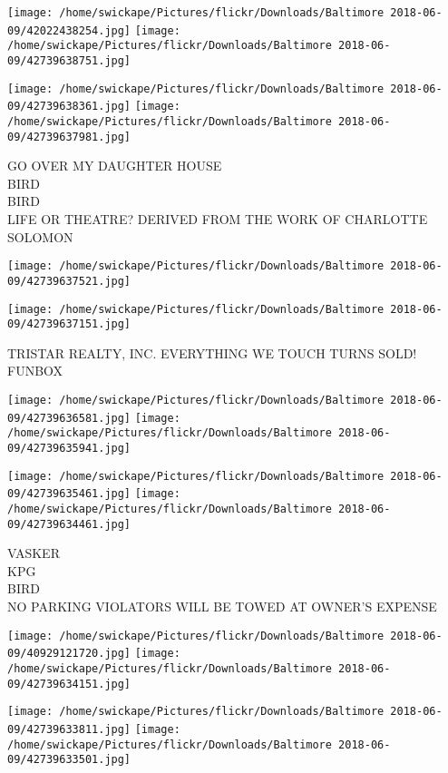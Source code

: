 \documentclass[10pt,letterpaper]{article}
\begin{document}
\texttt{[image: /home/swickape/Pictures/flickr/Downloads/Baltimore 2018-06-09/42022438254.jpg]}
\texttt{[image: /home/swickape/Pictures/flickr/Downloads/Baltimore 2018-06-09/42739638751.jpg]}

\texttt{[image: /home/swickape/Pictures/flickr/Downloads/Baltimore 2018-06-09/42739638361.jpg]}
\texttt{[image: /home/swickape/Pictures/flickr/Downloads/Baltimore 2018-06-09/42739637981.jpg]}

GO OVER MY DAUGHTER HOUSE\\
BIRD\\
BIRD\\
LIFE OR THEATRE? DERIVED FROM THE WORK OF CHARLOTTE SOLOMON
\pagebreak

\texttt{[image: /home/swickape/Pictures/flickr/Downloads/Baltimore 2018-06-09/42739637521.jpg]}

\vspace{0.25in}
\texttt{[image: /home/swickape/Pictures/flickr/Downloads/Baltimore 2018-06-09/42739637151.jpg]}

TRISTAR REALTY, INC. EVERYTHING WE TOUCH TURNS SOLD!\\
FUNBOX
\pagebreak

\texttt{[image: /home/swickape/Pictures/flickr/Downloads/Baltimore 2018-06-09/42739636581.jpg]}
\texttt{[image: /home/swickape/Pictures/flickr/Downloads/Baltimore 2018-06-09/42739635941.jpg]}

\texttt{[image: /home/swickape/Pictures/flickr/Downloads/Baltimore 2018-06-09/42739635461.jpg]}
\texttt{[image: /home/swickape/Pictures/flickr/Downloads/Baltimore 2018-06-09/42739634461.jpg]}

VASKER\\
KPG\\
BIRD\\
NO PARKING VIOLATORS WILL BE TOWED AT OWNER'S EXPENSE
\pagebreak

\texttt{[image: /home/swickape/Pictures/flickr/Downloads/Baltimore 2018-06-09/40929121720.jpg]}
\texttt{[image: /home/swickape/Pictures/flickr/Downloads/Baltimore 2018-06-09/42739634151.jpg]}

\texttt{[image: /home/swickape/Pictures/flickr/Downloads/Baltimore 2018-06-09/42739633811.jpg]}
\texttt{[image: /home/swickape/Pictures/flickr/Downloads/Baltimore 2018-06-09/42739633501.jpg]}
\end{document}
